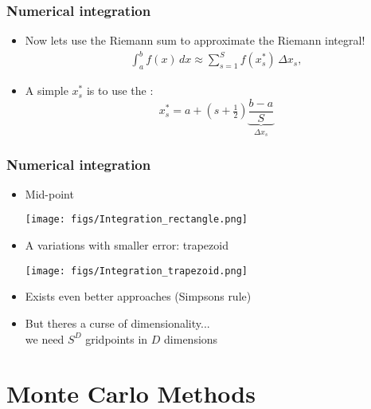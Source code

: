 \documentclass[10pt]{beamer}
\begin{document}
\begin{frame}
\frametitle{Numerical integration}


  \begin{itemize}
    \item Now lets use the Riemann sum to approximate the Riemann integral!
    \pause
    \begin{align*}
         {\displaystyle \int _{a}^{b}f(x)\,dx \approx \sum _{s=1}^{S}f(x_{s}^{*})\,\Delta x_{s},}
    \end{align*}
    \item A simple $x_{s}^{*}$ is to use the :
    \[
    x_s^* = a + \left(s + \tfrac{1}{2}\right)\underbrace{\frac{b-a}{S}}_{\Delta x_{s}}
    \]

  \end{itemize}

\end{frame}


\begin{frame}

\frametitle{Numerical integration}

\begin{itemize}
  \item Mid-point
\begin{center}
  \texttt{[image: figs/Integration\_rectangle.png]}
\end{center}
\item<2-> A variations with smaller error: trapezoid
  \begin{center}
    \texttt{[image: figs/Integration\_trapezoid.png]}
  \end{center}
\item<3-> Exists even better approaches (Simpsons rule)
\item<4-> But theres a curse of dimensionality... \\
we need $S^D$ gridpoints in $D$ dimensions
\end{itemize}

\end{frame}

\section{Monte Carlo Methods}
\frame{\sectionpage}



\end{document}

